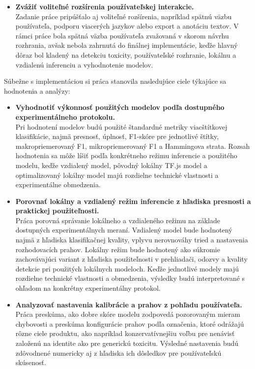 \begin{itemize}
  \item \textbf{Zvážiť voliteľné rozšírenia používateľskej interakcie.}\\
  Zadanie práce pripúšťalo aj voliteľné rozšírenia, napríklad spätnú väzbu používateľa, podporu viacerých jazykov alebo export a anotáciu textov. V rámci práce bola spätná väzba používateľa zvažovaná v skorom návrhu rozhrania, avšak nebola zahrnutá do finálnej implementácie, keďže hlavný dôraz bol kladený na detekciu toxicity, používateľské rozhranie, lokálnu a vzdialenú inferenciu a vyhodnotenie modelov.
\end{itemize}

Súbežne s implementáciou si práca stanovila nasledujúce ciele týkajúce sa hodnotenia a analýzy:
\begin{itemize}
  \item \textbf{Vyhodnotiť výkonnosť použitých modelov podľa dostupného experimentálneho protokolu.}\\
  Pri hodnotení modelov budú použité štandardné metriky viacštítkovej klasifikácie, najmä presnosť, úplnosť, F1-skóre pre jednotlivé štítky, makropriemerovaný F1, mikropriemerovaný F1 a Hammingova strata. Rozsah hodnotenia sa môže líšiť podľa konkrétneho režimu inferencie a použitého modelu, keďže vzdialený model, pôvodný lokálny TF.js model a optimalizovaný lokálny model majú rozdielne technické vlastnosti a experimentálne obmedzenia.
  \item \textbf{Porovnať lokálny a vzdialený režim inferencie z hľadiska presnosti a praktickej použiteľnosti.}\\
  Práca porovná správanie lokálneho a vzdialeného režimu na základe dostupných experimentálnych meraní. Vzdialený model bude hodnotený najmä z hľadiska klasifikačnej kvality, vplyvu nerovnováhy tried a nastavenia rozhodovacích prahov. Lokálny režim bude hodnotený ako súkromie zachovávajúci variant z hľadiska použiteľnosti v prehliadači, odozvy a kvality detekcie pri použitých lokálnych modeloch. Keďže jednotlivé modely majú rozdielne technické vlastnosti a obmedzenia, výsledky budú interpretované s ohľadom na konkrétny experimentálny protokol.
  \item \textbf{Analyzovať nastavenia kalibrácie a prahov z pohľadu používateľa.}\\
  Práca preskúma, ako dobre skóre modelu zodpovedá pozorovaným mieram chybovosti a preskúma konfigurácie prahov podľa označenia, ktoré odrážajú rôzne ciele produktu, ako napríklad konzervatívnejšiu voľbu pre nenávisť založenú na identite ako pre generickú toxicitu. Výsledné nastavenia budú zdôvodnené numericky aj z hľadiska ich dôsledkov pre používateľskú skúsenosť.

\end{itemize}
